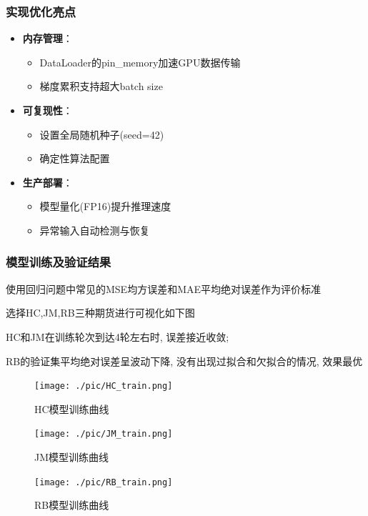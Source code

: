 \documentclass[a4paper,11pt]{ctexart}
\begin{document}
\subsubsection{实现优化亮点}
\begin{itemize}
\item \textbf{内存管理}：
  \begin{itemize}
  \item DataLoader的pin\_memory加速GPU数据传输
  \item 梯度累积支持超大batch size
  \end{itemize}
  
\item \textbf{可复现性}：
  \begin{itemize}
  \item 设置全局随机种子(seed=42)
  \item 确定性算法配置
  \end{itemize}
  
\item \textbf{生产部署}：
  \begin{itemize}
  \item 模型量化(FP16)提升推理速度
  \item 异常输入自动检测与恢复
  \end{itemize}
\end{itemize}
\subsubsection{模型训练及验证结果}
使用回归问题中常见的MSE均方误差和MAE平均绝对误差作为评价标准

选择HC,JM,RB三种期货进行可视化如下图

HC和JM在训练轮次到达4轮左右时, 误差接近收敛;

RB的验证集平均绝对误差呈波动下降, 没有出现过拟合和欠拟合的情况, 效果最优
\FloatBarrier
\noindent
\begin{figure}[H]
  \centering
  \texttt{[image: ./pic/HC\_train.png]}
  \caption*{HC模型训练曲线}
\end{figure}
\begin{figure}[H]
  \centering
  \texttt{[image: ./pic/JM\_train.png]}
  \caption*{JM模型训练曲线}
\end{figure}
\begin{figure}[H]
  \centering
  \texttt{[image: ./pic/RB\_train.png]}
  \caption*{RB模型训练曲线}
\end{figure}
\end{document}
